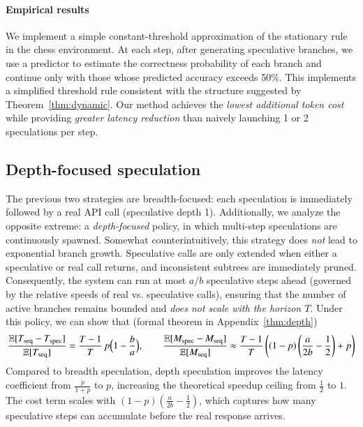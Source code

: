 \paragraph{Empirical results} We implement a simple constant-threshold approximation of the stationary rule in the chess environment. At each step, after generating speculative branches, we use a predictor to estimate the correctness probability of each branch and continue only with those whose predicted accuracy exceeds 50\%. This implements a simplified threshold rule consistent with the structure suggested by Theorem~\ref{thm:dynamic}. Our method achieves the \emph{lowest additional token cost} while providing \emph{greater latency reduction} than naively launching 1 or 2 speculations per step.
\subsection{Depth-focused speculation} 
\label{subsec:depth-focused}
The previous two strategies are breadth-focused: each speculation is immediately followed by a real API call (speculative depth 1). Additionally, we analyze the opposite extreme: a \emph{depth-focused} policy, in which multi-step speculations are continuously spawned. Somewhat counterintuitively, this strategy does \emph{not} lead to exponential branch growth. Speculative calls are only extended when either a speculative or real call returns, and inconsistent subtrees are immediately pruned. Consequently, the system can run at most $a/b$ speculative steps ahead (governed by the relative speeds of real vs. speculative calls), ensuring that the number of active branches remains bounded and \emph{does not scale with the horizon $T$}. Under this policy, we can show that (formal theorem in Appendix~\ref{thm:depth})
\[
    \frac{\mathbb{E}[T_{\mathrm{seq}} - T_{\mathrm{spec}}]}{\mathbb{E}[T_{\mathrm{seq}}]}
    = \frac{T-1}{T} \, p \Bigl(1 - \frac{b}{a}\Bigr),\qquad
    \frac{\mathbb{E}[M_{\mathrm{spec}} - M_{\mathrm{seq}}]}{\mathbb{E}[M_{\mathrm{seq}}]}
    \approx\frac{T-1}{T}\left((1-p)\left(\frac{a}{2b}-\frac{1}{2}\right)+p\right)
\]
Compared to breadth speculation, depth speculation improves the latency coefficient from $\frac{p}{1+p}$ to $p$, increasing the theoretical speedup ceiling from $\frac{1}{2}$ to $1$. 
The cost term scales with $(1-p)(\frac{a}{2b}-\frac{1}{2})$, which captures how many speculative steps can accumulate before the real response arrives. 

